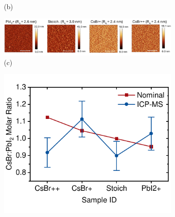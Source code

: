 \begin{figure}[htbp]
\begin{subfigure}[t]{0.45\textwidth}
        \caption*{(b)}
    \end{subfigure}

    \begin{subfigure}[t]{0.99\textwidth}
        \centering
        \includegraphics[width=\textwidth]{chapters/stability/imeges/Stability_Rotation_Stoich_AFM.pdf} %
        \caption*{(c)}
    \end{subfigure}

    \caption{}
    \label{}
\end{figure}


\begin{figure}[htbp]
    \centering
    \begin{subfigure}[t]{0.7\textwidth}
        \centering
        \includegraphics[width=\textwidth]{chapters/stability/imeges/Stability-ICP-MS.pdf} %
    \end{subfigure}

    \caption{}
    \label{}
\end{figure}


